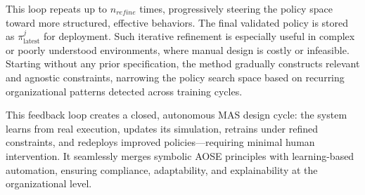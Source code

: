 \documentclass[pdflatex,sn-mathphys-num]{sn-jnl}%
\theoremstyle{thmstyleone}%
\theoremstyle{thmstyletwo}%
\theoremstyle{thmstylethree}%
\begin{document}
This loop repeats up to $n_{refine}$ times, progressively steering the policy space toward more structured, effective behaviors. The final validated policy is stored as $\pi^j_{\text{latest}}$ for deployment.
%
Such iterative refinement is especially useful in complex or poorly understood environments, where manual design is costly or infeasible. Starting without any prior specification, the method gradually constructs relevant and agnostic constraints, narrowing the policy search space based on recurring organizational patterns detected across training cycles.

\medskip

\noindent This feedback loop creates a closed, autonomous MAS design cycle: the system learns from real execution, updates its simulation, retrains under refined constraints, and redeploys improved policies—requiring minimal human intervention. It seamlessly merges symbolic AOSE principles with learning-based automation, ensuring compliance, adaptability, and explainability at the organizational level.
\end{document}
